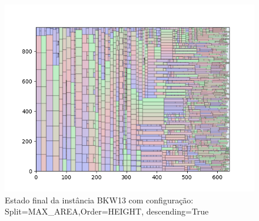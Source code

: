 \begin{figure}[H]
    \centering
    \caption[]{Estado final da instância BKW13 com configuração: Split=MAX_AREA,Order=HEIGHT, descending=True}
    \label{fig:bkw13-max_area-height-true}
    \includegraphics[scale=0.5]{output/figures/bkw/bkw13/max_area/height/true/0000}
\end{figure}
